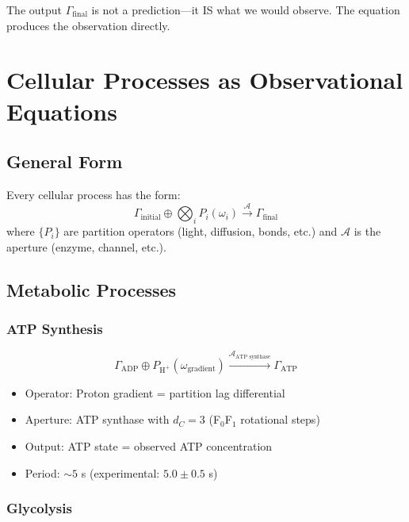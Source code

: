 \documentclass[aps,prd,twocolumn,superscriptaddress,floatfix,nofootinbib]{revtex4-2}
\theoremstyle{remark}
\newcommand{\Pop}{P}
\newcommand{\Gstate}{\Gamma}
\begin{document}
The output $\Gstate_{\text{final}}$ is not a prediction---it IS what we would observe. The equation produces the observation directly.

\section{Cellular Processes as Observational Equations}
\label{sec:processes}

\subsection{General Form}

Every cellular process has the form:
\begin{equation}
\Gstate_{\text{initial}} \oplus \bigotimes_i \Pop_i(\omega_i) \xrightarrow{\mathcal{A}} \Gstate_{\text{final}}
\end{equation}
where $\{\Pop_i\}$ are partition operators (light, diffusion, bonds, etc.) and $\mathcal{A}$ is the aperture (enzyme, channel, etc.).

\subsection{Metabolic Processes}

\subsubsection{ATP Synthesis}

\begin{equation}
\Gstate_{\text{ADP}} \oplus \Pop_{\text{H}^+}(\omega_{\text{gradient}}) \xrightarrow{\mathcal{A}_{\text{ATP synthase}}} \Gstate_{\text{ATP}}
\end{equation}

\begin{itemize}
\item Operator: Proton gradient = partition lag differential~\cite{mitchell1961}
\item Aperture: ATP synthase with $d_C = 3$ (F$_0$F$_1$ rotational steps)~\cite{boyer1997,walker1994}
\item Output: ATP state = observed ATP concentration
\item Period: $\sim 5$ s (experimental: $5.0 \pm 0.5$ s)~\cite{tu2005}
\end{itemize}

\subsubsection{Glycolysis}
\end{document}
